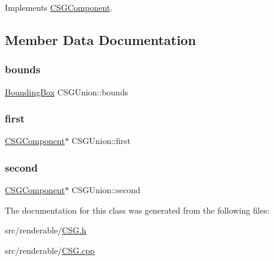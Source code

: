 Implements \mbox{\hyperlink{classCSGComponent_a4299365f2bab69272af9de4f2bee7cdb}{C\+S\+G\+Component}}.



\subsection{Member Data Documentation}
\mbox{\label{classCSGUnion_a40b5e5f99930721873da62db801e0c90}} 
\subsubsection{\texorpdfstring{bounds}{bounds}}
{\footnotesize\ttfamily \mbox{\hyperlink{classBoundingBox}{Bounding\+Box}} C\+S\+G\+Union\+::bounds\hspace{0.3cm}{\ttfamily [private]}}

\mbox{\label{classCSGUnion_ac2042150362043f8646dc9f13e98df1a}} 
\subsubsection{\texorpdfstring{first}{first}}
{\footnotesize\ttfamily \mbox{\hyperlink{classCSGComponent}{C\+S\+G\+Component}}$\ast$ C\+S\+G\+Union\+::first\hspace{0.3cm}{\ttfamily [private]}}

\mbox{\label{classCSGUnion_abb2099a585c204bdcf3c2d0c8004438e}} 
\subsubsection{\texorpdfstring{second}{second}}
{\footnotesize\ttfamily \mbox{\hyperlink{classCSGComponent}{C\+S\+G\+Component}}$\ast$ C\+S\+G\+Union\+::second\hspace{0.3cm}{\ttfamily [private]}}



The documentation for this class was generated from the following files\+:\begin{DoxyCompactItemize}
\item 
src/renderable/\mbox{\hyperlink{CSG_8h}{C\+S\+G.\+h}}\item 
src/renderable/\mbox{\hyperlink{CSG_8cpp}{C\+S\+G.\+cpp}}\end{DoxyCompactItemize}

